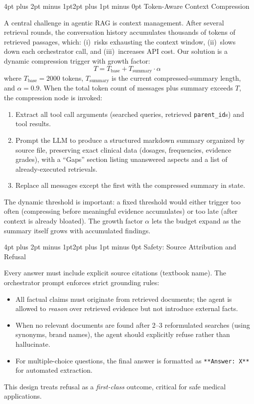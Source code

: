 \documentclass[10pt,twocolumn,letterpaper]{article}
\makeatletter
\renewcommand\subsection{\@startsection{subsection}{2}{\z@}%
  {4pt plus 2pt minus 1pt}{2pt plus 1pt minus 0pt}%
  {\normalsize\bfseries}}
\makeatother
\begin{document}
\subsection{Token-Aware Context Compression}
\label{sec:compression}

A central challenge in agentic RAG is context management. After several retrieval rounds, the conversation history accumulates thousands of tokens of retrieved passages, which: (i)~risks exhausting the context window, (ii)~slows down each orchestrator call, and (iii)~increases API cost. Our solution is a dynamic compression trigger with growth factor:
\begin{equation}
T = T_{\text{base}} + T_{\text{summary}} \cdot \alpha
\end{equation}
where $T_{\text{base}} = 2000$ tokens, $T_{\text{summary}}$ is the current compressed-summary length, and $\alpha = 0.9$. When the total token count of messages plus summary exceeds $T$, the compression node is invoked:
\begin{enumerate}[nosep,leftmargin=*,label=\arabic*.]
\item Extract all tool call arguments (searched queries, retrieved \texttt{parent\_id}s) and tool results.
\item Prompt the LLM to produce a structured markdown summary organized by source file, preserving exact clinical data (dosages, frequencies, evidence grades), with a ``Gaps'' section listing unanswered aspects and a list of already-executed retrievals.
\item Replace all messages except the first with the compressed summary in state.
\end{enumerate}
The dynamic threshold is important: a fixed threshold would either trigger too often (compressing before meaningful evidence accumulates) or too late (after context is already bloated). The growth factor $\alpha$ lets the budget expand as the summary itself grows with accumulated findings.

\subsection{Safety: Source Attribution and Refusal}

Every answer must include explicit source citations (textbook name). The orchestrator prompt enforces strict grounding rules:
\begin{itemize}[nosep,leftmargin=*]
\item All factual claims must originate from retrieved documents; the agent is allowed to \emph{reason} over retrieved evidence but not introduce external facts.
\item When no relevant documents are found after 2--3 reformulated searches (using synonyms, brand names), the agent should explicitly refuse rather than hallucinate.
\item For multiple-choice questions, the final answer is formatted as \texttt{**Answer: X**} for automated extraction.
\end{itemize}
This design treats refusal as a \emph{first-class} outcome, critical for safe medical applications.
\end{document}
